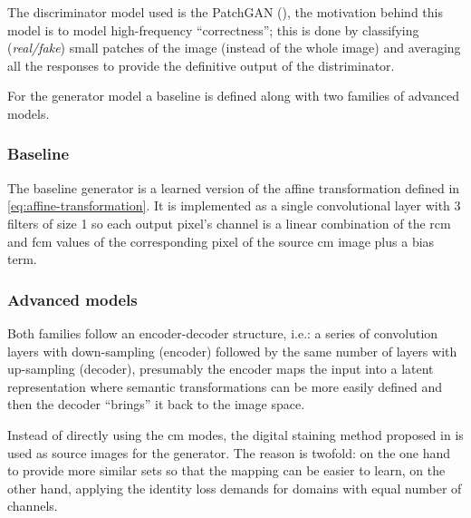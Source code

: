 \documentclass[../main.tex]{subfiles}
\begin{document}
The discriminator model used is the PatchGAN (\cite{Zhu2017a}), the motivation
behind this model is to model high-frequency ``correctness''; this is done
by classifying (\emph{real/fake}) small patches of the image
(instead of the whole image) and averaging
all the responses to provide the definitive output of the distriminator.

For the generator model a baseline is defined along with two families of
advanced models.

\subsubsection{Baseline}\label{sec:stain-baseline}
The baseline generator is a learned version of the affine transformation
defined in \eqref{eq:affine-transformation}.
It is implemented as a single convolutional layer
with 3 filters of size 1 so each output pixel's channel is a linear combination
of the \gls{rcm} and \gls{fcm} values of the corresponding pixel of the
source \gls{cm} image plus a bias term.

\subsubsection{Advanced models}
Both families follow an encoder-decoder
structure, i.e.: a series of convolution layers with down-sampling (encoder)
followed by the same number of layers with up-sampling\footnotemark{} (decoder),
presumably the encoder maps the input into a latent representation where
semantic transformations can be more easily defined and then the decoder
``brings'' it back to the image space.

Instead of directly using the \gls{cm} modes, the digital staining
method proposed in \parencite{Gareau2009} is used as source images for the
generator. The reason is twofold:
on the one hand to provide more similar sets so that
the mapping can be easier to learn, on the other hand, applying the
identity loss demands for domains with equal number of channels.
\end{document}
